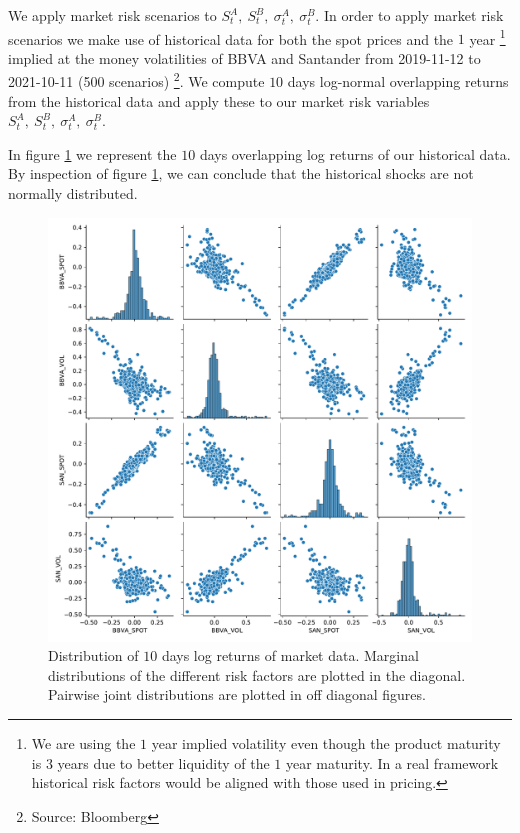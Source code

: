 We apply market risk scenarios to $S_t^A,\ S_t^B,\ \sigma_t^A,\ \sigma_t^B$.
In order to apply market risk scenarios we make use of historical data for both the spot prices and the $1$ year \footnote{We are using the $1$ year implied volatility even though the product maturity is $3$ years due to better liquidity of the $1$ year maturity. In a real framework historical risk factors would be aligned with those used in pricing.}   implied at the money volatilities of BBVA and Santander from 2019-11-12 to 2021-10-11 (500 scenarios) \footnote{Source: Bloomberg}. We compute $10$ days log-normal overlapping returns from the historical data and apply these to our market risk variables $S_t^A,\ S_t^B,\ \sigma_t^A,\ \sigma_t^B$.


In figure \ref{fig:distrib_P} we represent the $10$ days overlapping log returns of our historical data. By inspection of figure \ref{fig:distrib_P}, we can conclude that the historical shocks are not normally distributed.  

\begin{figure}[H] 
\centering
\includegraphics[width=1.0\textwidth]{Figures/MarketRisk/histdata.pdf}
\caption{Distribution of $10$ days log returns of market data. Marginal distributions of the different risk factors are plotted in the diagonal. Pairwise joint distributions are plotted in off diagonal figures.}
\label{fig:distrib_P}
\end{figure}

